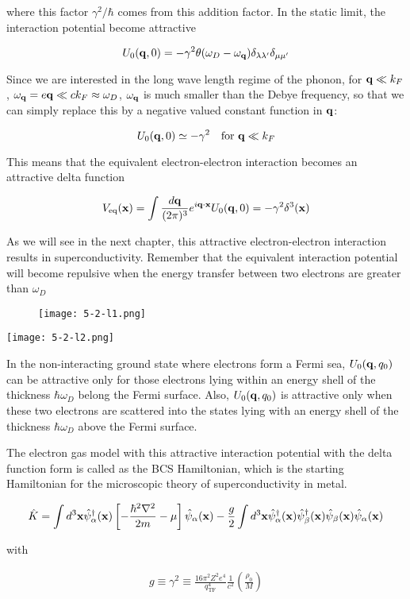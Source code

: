 where this factor $\gamma^2/\hbar$ comes from this addition factor. In the static limit, the interaction potential become attractive

\[ U_0({\bf q},0) = -\gamma^2\theta(\omega_D-\omega_{\bf q})\delta_{\lambda\lambda'}\delta_{\mu\mu'}\]

Since we are interested in the long wave length regime of the phonon, for ${\bf q}\ll k_F$, $\omega_{\bf q} = e{\bf q} \ll ck_F\approx\omega_D$, $\omega_{\bf q}$ is much smaller than the Debye frequency, so that we can simply replace this by a negative valued constant function in $\bf q$:

\[U_0({\bf q},0)\simeq -\gamma^2\quad\text{for }{\bf q}\ll k_F \]

This means that the equivalent electron-electron interaction becomes an attractive delta function

\[V_{\text{eq}}({\bf x}) = \int\frac{d\bf q}{(2\pi)^3}e^{i\bf q\cdot x}U_0({\bf q},0) = -\gamma^2\delta^3(\bf x) \]

As we will see in the next chapter, this attractive electron-electron interaction results in superconductivity. Remember that the equivalent interaction potential will become repulsive when the energy transfer between two electrons are greater than $\omega_D$

\begin{wrapfigure}{r}{5.5cm}
\texttt{[image: 5-2-l1.png]}
\end{wrapfigure}
\texttt{[image: 5-2-l2.png]}

In the non-interacting ground state where electrons form a Fermi sea, $U_0({\bf q},q_0)$ can be attractive only for those electrons lying within an energy shell of the thickness $\hbar\omega_D$ belong the Fermi surface. Also, $U_0({\bf q},q_0)$ is attractive only when these two electrons are scattered into the states lying with an energy shell of the thickness $\hbar\omega_D$ above the Fermi surface. 

The electron gas model with this attractive interaction potential with the delta function form is called as the BCS Hamiltonian, which is the starting Hamiltonian for the microscopic theory of superconductivity in metal. 

\[\hat{K} = \int d^3{\bf x}\hat{\psi}^\dagger_\alpha({\bf x})\left[-\frac{\hbar^2\nabla^2}{2m}-\mu\right]\hat{\psi}_\alpha({\bf x}) - \frac{g}{2}\int d^3{\bf x} \hat{\psi}^\dagger_\alpha({\bf x})\hat{\psi}^\dagger_\beta({\bf x})\hat{\psi}_\beta({\bf x})\hat{\psi}_\alpha({\bf x})\]

with

\begin{align}\tag{C}
g\equiv\gamma^2\equiv\frac{16\pi^2 Z^2 e^4}{q_{\text{TF}}^4}\frac{1}{c^2}\left(\frac{\rho_0}{M}\right) \end{align}



